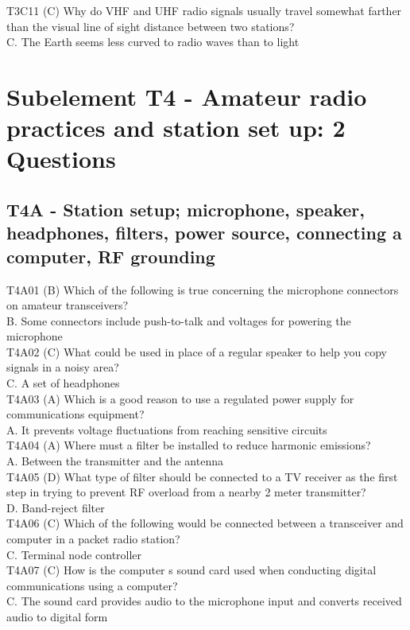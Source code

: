 \documentclass[12pt,letterpaper]{report}
\begin{document}
T3C11 (C) Why do VHF and UHF radio signals usually travel somewhat farther than the visual line of sight distance between two stations?\\
C. The Earth seems less curved to radio waves than to light\\

\chapter{Subelement T4 - Amateur radio practices and station set up: 2 Questions}
\section{T4A - Station setup; microphone, speaker, headphones, filters, power source, connecting a computer, RF grounding}

T4A01 (B) Which of the following is true concerning the microphone connectors on amateur transceivers?\\
B. Some connectors include push-to-talk and voltages for powering the microphone\\

T4A02 (C) What could be used in place of a regular speaker to help you copy signals in a noisy area?\\
C. A set of headphones\\

T4A03 (A) Which is a good reason to use a regulated power supply for communications equipment?\\
A. It prevents voltage fluctuations from reaching sensitive circuits\\

T4A04 (A) Where must a filter be installed to reduce harmonic emissions?\\
A. Between the transmitter and the antenna\\

T4A05 (D) What type of filter should be connected to a TV receiver as the first step in trying to prevent RF overload from a nearby 2 meter transmitter?\\
D. Band-reject filter\\

T4A06 (C) Which of the following would be connected between a transceiver and computer in a packet radio station?\\
C. Terminal node controller\\

T4A07 (C) How is the computer s sound card used when conducting digital communications using a computer?\\
C. The sound card provides audio to the microphone input and converts received audio to digital form\\
\end{document}
